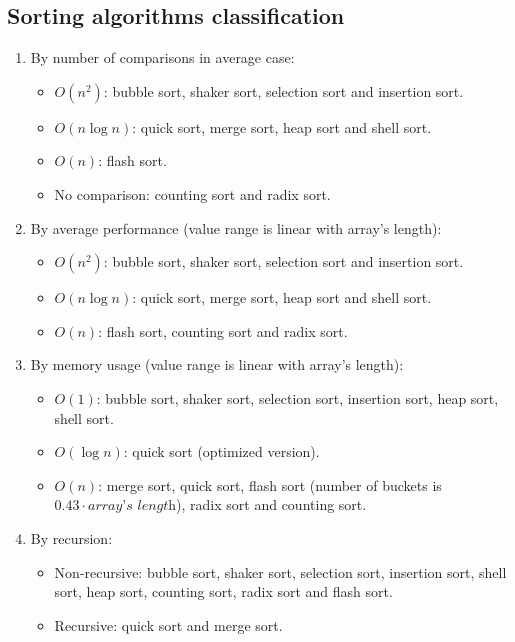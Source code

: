 \documentclass[12pt]{article}
\begin{document}
\subsection{Sorting algorithms classification}
\begin{enumerate}
    \item By number of comparisons in average case:
    \begin{itemize}
        \item $O(n^2)$: bubble sort, shaker sort, selection sort and insertion sort.
        \item $O(n\log n)$: quick sort, merge sort, heap sort and shell sort.
        \item $O(n)$: flash sort.
        \item No comparison: counting sort and radix sort.
    \end{itemize}
    \item By average performance (value range is linear with array's length):
    \begin{itemize}
        \item $O(n^2)$: bubble sort, shaker sort, selection sort and insertion sort.
        \item $O(n\log n)$: quick sort, merge sort, heap sort and shell sort.
        \item $O(n)$: flash sort, counting sort and radix sort.
    \end{itemize}
    \item By memory usage (value range is linear with array's length):
    \begin{itemize}
        \item $O(1)$: bubble sort, shaker sort, selection sort, insertion sort, heap sort, shell sort.
        \item $O(\log n)$: quick sort (optimized version).
        \item $O(n)$: merge sort, quick sort, flash sort (number of buckets is $0.43\cdot \textit{array's length}$), radix sort and counting sort.
    \end{itemize}
    \item By recursion:
    \begin{itemize}
        \item Non-recursive: bubble sort, shaker sort, selection sort, insertion sort, shell sort, heap sort, counting sort, radix sort and flash sort.
        \item Recursive: quick sort and merge sort.
    \end{itemize}
\end{enumerate}
\end{document}
